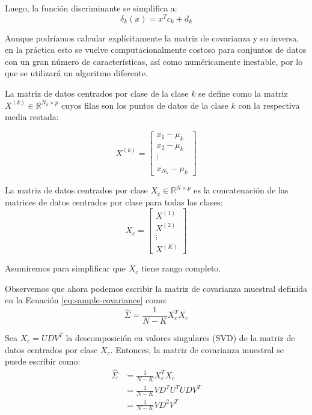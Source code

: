 Luego, la función discriminante se simplifica a:
\[
\delta_k(x) = x^T c_k + d_k
\]

Aunque podríamos calcular explícitamente la matriz de covarianza y su inversa, en la práctica esto se vuelve computacionalmente costoso para conjuntos de datos con un gran número de características, así como numéricamente inestable, por lo que se utilizará un algoritmo diferente.

\begin{definition}
La matriz de datos centrados por clase de la clase $k$ se define como la matriz $X^{(k)} \in \mathbb{R}^{N_{k} \times p}$ cuyos filas son los puntos de datos de la clase $k$ con la respectiva media restada:

$$
X^{(k)} = \begin{bmatrix}
x_{1} - \mu_{k} \\
x_{2} - \mu_{k}  \\
\vdots \\  \\
x_{N_{k}} - \mu_{k}
\end{bmatrix}
$$
\end{definition}

\begin{definition}
La matriz de datos centrados por clase $X_c \in \mathbb{R}^{N \times p}$ es la concatenación de las matrices de datos centrados por clase para todas las clases:
\[
X_c = \begin{bmatrix}
X^{(1)} \\ X^{(2)} \\ \vdots \\ X^{(K)}
\end{bmatrix}
\]
\end{definition}

Asumiremos para simplificar que $X_c$ tiene rango completo.

Observemos que ahora podemos escribir la matriz de covarianza muestral definida en la Ecuación \ref{eq:sample-covariance} como:
\[
\hat{\Sigma} = \frac{1}{N - K} X_c^T X_c
\]

Sea $X_c = U D V^T$ la descomposición en valores singulares (SVD) de la matriz de datos centrados por clase $X_c$. Entonces, la matriz de covarianza muestral se puede escribir como:
\begin{align*}
\hat{\Sigma} &= \frac{1}{N - K} X_{c}^{T} X_{c}  \\
&= \frac{1}{N - K} VD^{T}U^{T}UDV^{T} \\
&= \frac{1}{N - K} VD^{2}V^{T} \\
\end{align*}

